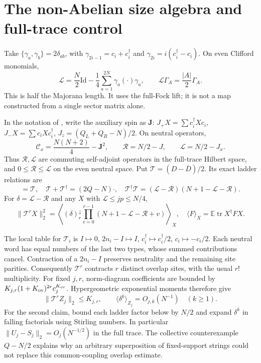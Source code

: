 \documentclass[11pt]{article}
\newcommand{\EE}{\mathbb E}
\newcommand{\tr}{\operatorname{tr}}
\newcommand{\RR}{\mathcal R}
\newcommand{\LL}{\mathcal L}
\newcommand{\TT}{\mathcal T}
\newcommand{\Db}{\overline D}
\newcommand{\Id}{\mathrm{Id}}
\begin{document}
\newpage
\section{The non-Abelian size algebra and full-trace control}
Take $\{\gamma_a,\gamma_b\}=2\delta_{ab}$, with
$\gamma_{2i-1}=c_i+c_i^\dagger$ and
$\gamma_{2i}=i(c_i^\dagger-c_i)$. On even Clifford monomials,
\begin{equation}
 \LL=\frac N2\Id-\frac14\sum_{a=1}^{2N}\gamma_a(\cdot)\gamma_a,
 \qquad \LL\Gamma_A=\frac{|A|}{2}\Gamma_A.\label{eq:length}
\end{equation}
This is half the Majorana length. It uses the full-Fock lift; it is not
a map constructed from a single sector matrix alone.

In the notation of \cite{TX}, write the auxiliary spin as $\mathbf J$:
$J_+X=\sum c_i^\dagger Xc_i$, $J_-X=\sum c_iXc_i^\dagger$,
$J_z=(Q_L+Q_R-N)/2$. On neutral operators,
\begin{equation}
 \mathcal C_x=\frac{N(N+2)}4-\mathbf J^2,
 \qquad \RR=N/2-J,\qquad \LL=N/2-J_x.
\end{equation}
Thus $\RR,\LL$ are commuting self-adjoint operators in the full-trace
Hilbert space, and $0\le\RR\le\LL$ on the even neutral space.
Put $\TT=(D-\Db)/2$. Its exact ladder relations are
\begin{equation}
 [\TT,\LL]=\TT,\quad
 \TT+\TT^\dagger=(2Q-N)\cdot,\quad
 \TT^\dagger\TT=(\LL-\RR)(N+1-\LL-\RR).\label{eq:ladder}
\end{equation}
For $\delta=\LL-\RR$ and any $X$ with $\LL\le jp\le N/4$,
\begin{equation}
 \|\TT^rX\|_2^2=
 \left\langle (\delta)_r^\downarrow
       \prod_{v=0}^{r-1}(N+1-\LL-\RR+v)\right\rangle_X,
 \quad \langle F\rangle_X=\EE\tr X^\dagger FX.\label{eq:ladder-r}
\end{equation}

The local table for $\TT_i$ is
$I\mapsto0$, $2n_i-I\mapsto I$, $c_i^\dagger\mapsto c_i^\dagger/2$,
$c_i\mapsto-c_i/2$. Each neutral word has equal numbers of the last
two types, whose summed contributions cancel. Contraction of a
$2n_i-I$ preserves neutrality and the remaining site parities.
Consequently $\TT^r$ contracts $r$ distinct overlap sites, with the
usual $r!$ multiplicity. For fixed $j,r$, norm-diagram coefficients
are bounded by $K_{j,r}(1+K_{\rm ov})^{2r}c_j^{K_{\rm ov}}$.
Hypergeometric exponential moments therefore give
\begin{equation}
 \|\TT^r Z_j\|_2\le K_{j,r},\qquad
 \langle\delta^k\rangle_{Z_j}=O_{j,k}(N^{-1})\quad(k\ge1).\label{eq:delta}
\end{equation}
For the second claim, bound each ladder factor below by $N/2$ and
expand $\delta^k$ in falling factorials using Stirling numbers.
In particular $\|U_j-S_j\|_2=O_j(N^{-1/2})$ in the full trace.
The collective counterexample $Q-N/2$ explains why an arbitrary
superposition of fixed-support strings could not replace this
common-coupling overlap estimate.
\end{document}
